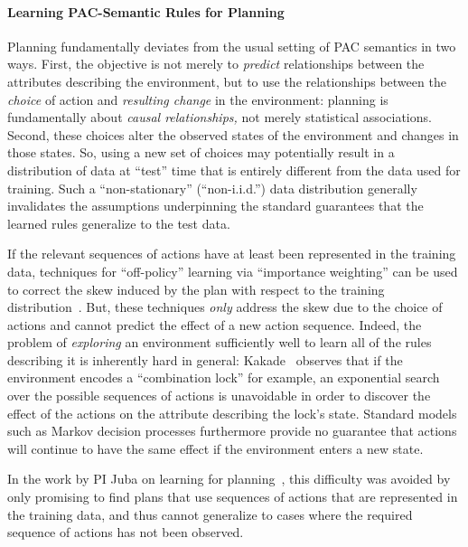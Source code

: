 \documentclass[12pt]{article}
\begin{document}
\paragraph{Learning PAC-Semantic Rules for Planning}
Planning fundamentally deviates from the usual setting of PAC semantics in two ways. First, the objective is not merely to {\em predict} relationships between the attributes describing the environment, but to use the relationships between the {\em choice} of action and {\em resulting change} in the environment: planning is fundamentally about {\em causal relationships,} not merely statistical associations. Second, these choices alter the observed states of the environment and changes in those states. So, using a new set of choices may potentially result in a distribution of data at ``test'' time that is entirely different from the data used for training. Such a ``non-stationary'' (``non-i.i.d.'') data distribution generally invalidates the assumptions underpinning the standard guarantees that the learned rules generalize to the test data.

If the relevant sequences of actions have at least been represented in the training data, techniques for ``off-policy'' learning via ``importance weighting'' can be used to correct the skew induced by the plan with respect to the training distribution~\cite{precup2000off-policy,precup2001off-policy,shelton2001,peshkin2001,peshkin2002,uchibe2004,wawrzynski2009,hachiya2009,hachiya2011,juba2016jmlr}. But, these techniques {\em only} address the skew due to the choice of actions and cannot predict the effect of a new action sequence. Indeed, the problem of {\em exploring} an environment sufficiently well to learn all of the rules describing it is inherently hard in general: Kakade~\cite[Section~8.6]{kakade2003thesis} observes that if the environment encodes a ``combination lock'' for example, an exponential search over the possible sequences of actions is unavoidable in order to discover the effect of the actions on the attribute describing the lock's state. Standard models such as Markov decision processes furthermore provide no guarantee that actions will continue to have the same effect if the environment enters a new state. 

In the work by PI Juba on learning for planning~\cite{juba2016jmlr}, this difficulty was avoided by only promising to find plans that use sequences of actions that are represented in the training data, and thus cannot generalize to cases where the required sequence of actions has not been observed. %
\end{document}
